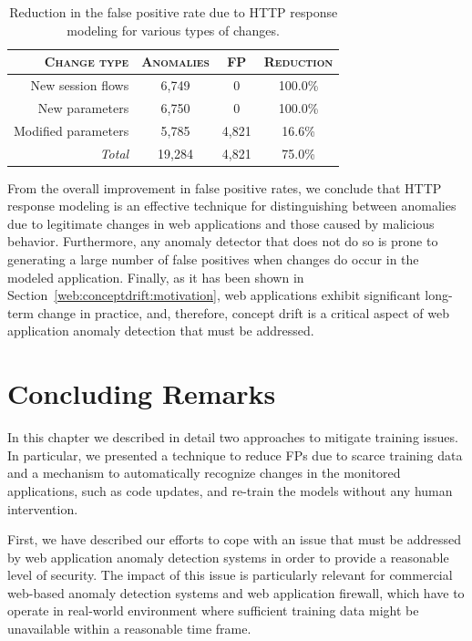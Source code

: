 \begin{table}[t]
  \centering
  \begin{tabular}{rccc}
    \toprule
    \textsc{Change type} & \textsc{Anomalies} & \textsc{FP} & \textsc{Reduction} \\
    \midrule
    New session flows & 6,749 & 0 & 100.0\% \\
    New parameters & 6,750 & 0 & 100.0\% \\
    Modified parameters & 5,785 & 4,821 & 16.6\% \\
    \cmidrule{2-4}
    \emph{Total} & 19,284 & 4,821 & 75.0\% \\
    \bottomrule
  \end{tabular}

  \caption{Reduction in the false positive rate due to \ac{HTTP} response modeling for various types of changes.}
  \label{fig:fpr-table}
  \vspace*{-.65cm}
\end{table}

From the overall improvement in false positive rates, we conclude that \ac{HTTP} response modeling is an effective technique for distinguishing between anomalies due to legitimate changes in web applications and those caused by malicious behavior.  Furthermore, any anomaly detector that does not do so is prone to generating a large number of false positives when changes do occur in the modeled application.  Finally, as it has been shown in Section~\ref{web:conceptdrift:motivation}, web applications exhibit significant long-term change in practice, and, therefore, concept drift is a critical aspect of web application anomaly detection that must be addressed.

\section{Concluding Remarks}
\label{web:conclusions}
In this chapter we described in detail two approaches to mitigate training issues. In particular, we presented a technique to reduce \acp{FP} due to scarce training data and a mechanism to automatically recognize changes in the monitored applications, such as code updates, and re-train the models without any human intervention.

First, we have described our efforts to cope with an issue that must be addressed by web application anomaly detection systems in order to provide a reasonable level of security.  The impact of this issue is particularly relevant for commercial web-based anomaly detection systems and web application firewall, which have to operate in real-world environment where sufficient training data might be unavailable within a reasonable time frame.

